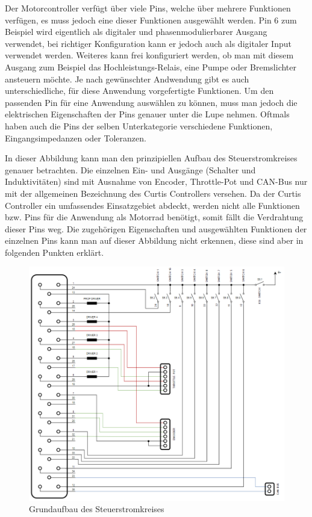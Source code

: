 \vspace{5mm}

Der Motorcontroller verfügt über viele Pins, welche über mehrere Funktionen verfügen, es muss jedoch eine dieser Funktionen ausgewählt werden. Pin 6 zum Beispiel wird eigentlich als digitaler und phasenmodulierbarer Ausgang verwendet, bei richtiger Konfiguration kann er jedoch auch als digitaler Input verwendet werden. Weiteres kann frei konfiguriert werden, ob man mit diesem Ausgang zum Beispiel das Hochleistungs-Relais, eine Pumpe oder Bremslichter ansteuern möchte. Je nach gewünschter Andwendung gibt es auch unterschiedliche, für diese Anwendung vorgefertigte Funktionen. Um den passenden Pin für eine Anwendung auswählen zu können, muss man jedoch die elektrischen Eigenschaften der Pins genauer unter die Lupe nehmen. Oftmals haben auch die Pins der selben Unterkategorie verschiedene Funktionen, Eingangsimpedanzen oder Toleranzen. 

\newpage
In dieser Abbildung kann man den prinzipiellen Aufbau des Steuerstromkreises genauer betrachten. Die einzelnen Ein- und Ausgänge (Schalter und Induktivitäten) sind mit Ausnahme von Encoder, Throttle-Pot und CAN-Bus nur mit der allgemeinen Bezeichnung des Curtis Controllers versehen. Da der Curtis Controller ein umfassendes Einsatzgebiet abdeckt, werden nicht alle Funktionen bzw. Pins für die Anwendung als Motorrad benötigt, somit fällt die Verdrahtung dieser Pins weg. Die zugehörigen Eigenschaften und ausgewählten Funktionen der einzelnen Pins kann man auf dieser Abbildung nicht erkennen, diese sind aber in folgenden Punkten erklärt.
\vspace{5mm}

\begin{figure}[H]
	\begin{center}
		\includegraphics[scale=0.67]{figures/Antrieb/Antrieb_Steuerstromkreis.png}
		\caption{Grundaufbau des Steuerstromkreises}
	\end{center}
\end{figure}


